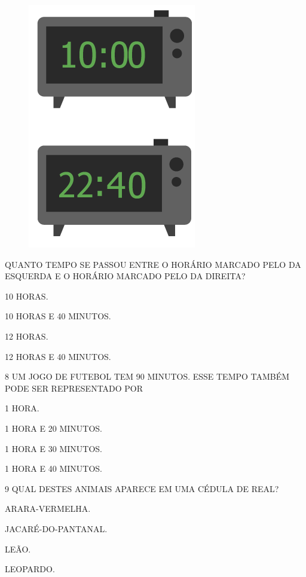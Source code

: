 \begin{figure}[htpb!]
\centering
\includegraphics[width=.3\textwidth]{./media/SAEB_1ANO_MAT_FIGURA139.png}
\end{figure}

QUANTO TEMPO SE PASSOU ENTRE O HORÁRIO MARCADO PELO DA ESQUERDA E O HORÁRIO MARCADO PELO DA DIREITA?

\begin{escolha}[itemsep=0pt]
\item 10 HORAS.

\item 10 HORAS E 40 MINUTOS.

\item 12 HORAS.

\item 12 HORAS E 40 MINUTOS.
\end{escolha}

\num{8} UM JOGO DE FUTEBOL TEM 90 MINUTOS. ESSE TEMPO TAMBÉM PODE SER
REPRESENTADO POR

\begin{escolha}[itemsep=0pt]
\item 1 HORA.

\item 1 HORA E 20 MINUTOS.

\item 1 HORA E 30 MINUTOS.

\item 1 HORA E 40 MINUTOS.
\end{escolha}

\pagebreak
\num{9} QUAL DESTES ANIMAIS APARECE EM UMA CÉDULA DE REAL?

\begin{escolha}[itemsep=0pt]
\item ARARA-VERMELHA.

\item JACARÉ-DO-PANTANAL.

\item LEÃO.

\item LEOPARDO.
\end{escolha}

